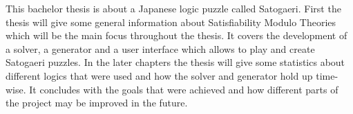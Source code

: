 This bachelor thesis is about a Japanese logic puzzle called Satogaeri. First the thesis will give some general information about Satisfiability Modulo Theories which will be the main focus throughout the thesis. It covers the development of a solver, a generator and a user interface which allows to play and create Satogaeri puzzles. In the later chapters the thesis will give some statistics about different logics that were used and how the solver and generator hold up time-wise. It concludes with the goals that were achieved and how different parts of the project may be improved in the future.